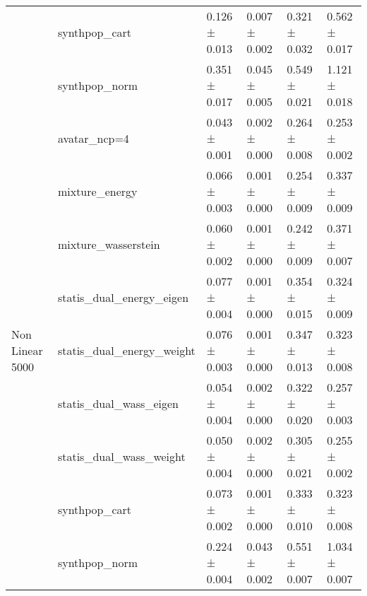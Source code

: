 \begin{tabular}{llllll}
 & synthpop_cart & 0.126 ± 0.013 & \cellcolor{mygreen}0.007 ± 0.002 & 0.321 ± 0.032 & 0.562 ± 0.017 \\
 & synthpop_norm & \cellcolor{myred}0.351 ± 0.017 & \cellcolor{myred}0.045 ± 0.005 & \cellcolor{myred}0.549 ± 0.021 & \cellcolor{myred}1.121 ± 0.018 \\
\cline{1-6}
\multirow[t]{9}{*}{Non Linear 5000} & avatar_ncp=4 & \cellcolor{mygreen}0.043 ± 0.001 & 0.002 ± 0.000 & 0.264 ± 0.008 & \cellcolor{mygreen}0.253 ± 0.002 \\
 & mixture_energy & 0.066 ± 0.003 & \cellcolor{mygreen}0.001 ± 0.000 & 0.254 ± 0.009 & 0.337 ± 0.009 \\
 & mixture_wasserstein & 0.060 ± 0.002 & \cellcolor{mygreen}0.001 ± 0.000 & \cellcolor{mygreen}0.242 ± 0.009 & 0.371 ± 0.007 \\
 & statis_dual_energy_eigen & 0.077 ± 0.004 & \cellcolor{mygreen}0.001 ± 0.000 & 0.354 ± 0.015 & 0.324 ± 0.009 \\
 & statis_dual_energy_weight & 0.076 ± 0.003 & \cellcolor{mygreen}0.001 ± 0.000 & 0.347 ± 0.013 & 0.323 ± 0.008 \\
 & statis_dual_wass_eigen & 0.054 ± 0.004 & 0.002 ± 0.000 & 0.322 ± 0.020 & 0.257 ± 0.003 \\
 & statis_dual_wass_weight & 0.050 ± 0.004 & 0.002 ± 0.000 & 0.305 ± 0.021 & 0.255 ± 0.002 \\
 & synthpop_cart & 0.073 ± 0.002 & \cellcolor{mygreen}0.001 ± 0.000 & 0.333 ± 0.010 & 0.323 ± 0.008 \\
 & synthpop_norm & \cellcolor{myred}0.224 ± 0.004 & \cellcolor{myred}0.043 ± 0.002 & \cellcolor{myred}0.551 ± 0.007 & \cellcolor{myred}1.034 ± 0.007 \\
\cline{1-6}
\bottomrule
\end{tabular}
